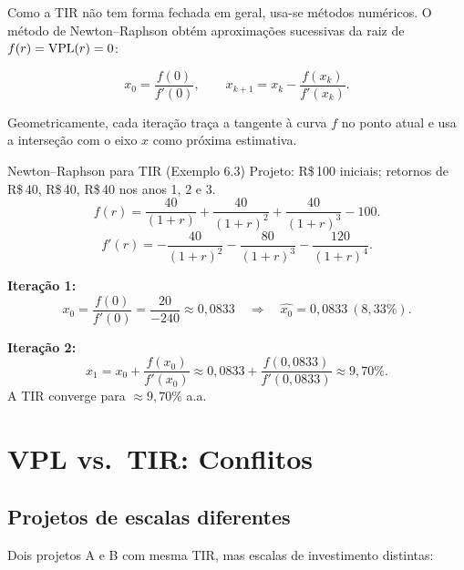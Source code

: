 Como a TIR não tem forma fechada em geral, usa-se métodos numéricos.
O método de Newton--Raphson obtém aproximações sucessivas da raiz de $f(r) = \mathrm{VPL}(r) = 0$:

\begin{resultado}
\[
  x_0 = \frac{f(0)}{f'(0)}, \qquad
  x_{k+1} = x_k - \frac{f(x_k)}{f'(x_k)}.
\]
\end{resultado}

Geometricamente, cada iteração traça a tangente à curva $f$ no ponto atual e usa
a interseção com o eixo $x$ como próxima estimativa.

\begin{exemplo}{Newton--Raphson para TIR (Exemplo 6.3)}
Projeto: R\$\,100 iniciais; retornos de R\$\,40, R\$\,40, R\$\,40 nos anos 1, 2 e 3.
\[
  f(r) = \frac{40}{(1+r)} + \frac{40}{(1+r)^2} + \frac{40}{(1+r)^3} - 100.
\]
\[
  f'(r) = -\frac{40}{(1+r)^2} - \frac{80}{(1+r)^3} - \frac{120}{(1+r)^4}.
\]

\textbf{Iteração 1:}
\[
  x_0 = \frac{f(0)}{f'(0)} = \frac{20}{-240} \approx 0{,}0833
  \quad\Rightarrow\quad \widehat{x_0} = 0{,}0833\ (8{,}33\%).
\]

\textbf{Iteração 2:}
\[
  x_1 = x_0 + \frac{f(x_0)}{f'(x_0)}
       \approx 0{,}0833 + \frac{f(0{,}0833)}{f'(0{,}0833)}
       \approx 9{,}70\%.
\]
A TIR converge para $\approx 9{,}70\%$ a.a.
\end{exemplo}

\section{VPL vs.\ TIR: Conflitos}

\subsection{Projetos de escalas diferentes}

Dois projetos A e B com mesma TIR, mas escalas de investimento distintas:

\begin{center}
\end{center}

